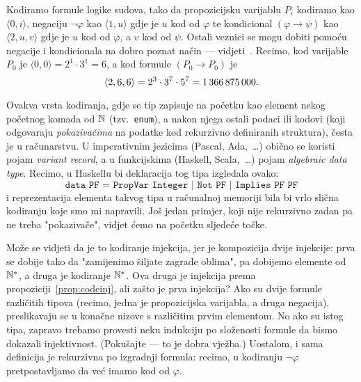 \begin{primjer}[{name=[primitivna rekurzivnost skupa svih formula logike sudova]}]\label{pr:lskod}
Kodiramo formule logike sudova, tako da propozicijsku varijablu $P_i$ kodiramo kao $\langle0,i\rangle$, negaciju $\lnot\varphi$ kao $\langle1,u\rangle$ gdje je $u$ kod od $\varphi$ te kondicional $(\varphi\to\psi)$ kao $\langle2,u,v\rangle$ gdje je $u$ kod od $\varphi$, a $v$ kod od $\psi$. Ostali veznici se mogu dobiti pomoću negacije i kondicionala na dobro poznat način --- vidjeti~\cite{skr:VukML}. Recimo, kod varijable $P_0$ je $\langle0,0\rangle=2^1\cdot3^1=6$, a kod formule $(P_0\to P_0)$ je \begin{equation}
    \langle2,6,6\rangle=2^3\cdot3^7\cdot5^7=1\,366\,875\,000\text.
\end{equation}

Ovakva vrsta kodiranja, gdje se tip zapisuje na početku kao element nekog početnog komada od ${\mathbb N}$ (tzv.\ \texttt{enum}), a nakon njega ostali podaci ili kodovi (koji odgovaraju \emph{pokazivačima} na podatke kod rekurzivno definiranih struktura), česta je u računarstvu. U imperativnim jezicima (Pascal, Ada,~\ldots) obično se koristi pojam \emph{variant record}, a u funkcijskima (Haskell, Scala,~\ldots) pojam \emph{algebraic data type}. Recimo, u Haskellu bi deklaracija tog tipa izgledala ovako:
\begin{equation}
\texttt{data PF = PropVar Integer | Not PF | Implies PF PF}
\end{equation}
i reprezentacija elementa takvog tipa u računalnoj memoriji bila bi vrlo slična kodiranju koje smo mi napravili. Još jedan primjer, koji nije rekurzivno zadan pa ne treba "pokazivače", vidjet ćemo na početku sljedeće točke.

Može se vidjeti da je to kodiranje injekcija, jer je kompozicija dvije injekcije: prva se dobije tako da "zamijenimo šiljate zagrade oblima", pa dobijemo elemente od ${\mathbb N}^*$, a druga je kodiranje ${\mathbb N}^*$. Ova druga je injekcija prema propoziciji~\ref{prop:codeinj}, ali zašto je prva injekcija? Ako su dvije formule različitih tipova (recimo, jedna je propozicijska varijabla, a druga negacija), preslikavaju se u konačne nizove s različitim prvim elementom. No ako su istog tipa, zapravo trebamo provesti neku indukciju po složenosti formule da bismo dokazali injektivnost. (Pokušajte --- to je dobra vježba.) Uostalom, i sama definicija je rekurzivna po izgradnji formula: recimo, u kodiranju $\lnot\varphi$ pretpostavljamo da već imamo kod od $\varphi$.


\end{primjer}
